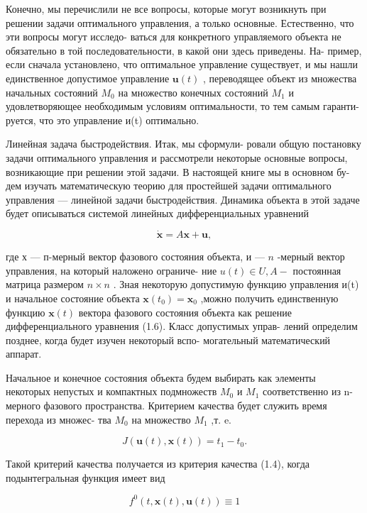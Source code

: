 \documentclass[8pt]{extarticle}
\begin{document}
Конечно, мы перечислили не все вопросы, которые могут возникнуть при решении задачи оптимального управления, а только основные. Естественно, что эти вопросы могут исследо- ваться для конкретного управляемого объекта не обязательно в той последовательности, в какой они здесь приведены. На- пример, если сначала установлено, что оптимальное управление существует, и мы нашли единственное допустимое управление \(\mathbf{u}\left( t\right)\) , переводящее объект из множества начальных состояний \({M}_{0}\) на множество конечных состояний \({M}_{1}\) и удовлетворяющее необходимым условиям оптимальности, то тем самым гаранти- руется, что это управление и(t) оптимально.

Линейная задача быстродействия. Итак, мы сформули- ровали общую постановку задачи оптимального управления и рассмотрели некоторые основные вопросы, возникающие при решении этой задачи. В настоящей книге мы в основном бу- дем изучать математическую теорию для простейшей задачи оптимального управления — линейной задачи быстродействия. Динамика объекта в этой задаче будет описываться системой линейных дифференциальных уравнений

\[
\dot{\mathbf{x}} = A\mathbf{x} + \mathbf{u}, \tag{1.6}
\]

где х — п-мерный вектор фазового состояния объекта, и — \(n\) -мерный вектор управления, на который наложено ограниче- ние \(u\left( t\right)  \in  U,A -\) постоянная матрица размером \(n \times  n\) . Зная некоторую допустимую функцию управления и(t) и начальное состояние объекта \(\mathbf{x}\left( {t}_{0}\right)  = {\mathbf{x}}_{0}\) ,можно получить единственную функцию \(\mathbf{x}\left( t\right)\) вектора фазового состояния объекта как решение дифференциального уравнения (1.6). Класс допустимых управ- лений определим позднее, когда будет изучен некоторый вспо- могательный математический аппарат.

Начальное и конечное состояния объекта будем выбирать как элементы некоторых непустых и компактных подмножеств \({M}_{0}\) и \({M}_{1}\) соответственно из n-мерного фазового пространства. Критерием качества будет служить время перехода из множес- тва \({M}_{0}\) на множество \({M}_{1}\) ,т. e.

\[
J\left( {\mathbf{u}\left( t\right) ,\mathbf{x}\left( t\right) }\right)  = {t}_{1} - {t}_{0}.
\]

Такой критерий качества получается из критерия качества (1.4), когда подынтегральная функция имеет вид

\[
{f}^{0}\left( {t,\mathbf{x}\left( t\right) ,\mathbf{u}\left( t\right) }\right)  \equiv  1
\]
\end{document}
